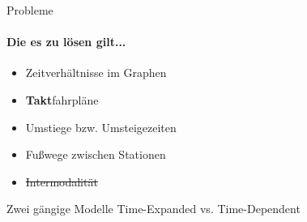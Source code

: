 \begin{frame}{Probleme}
	\framesubtitle{Die es zu lösen gilt...}
	\begin{itemize}
		\item Zeitverhältnisse im Graphen \pause
		\item \textbf{Takt}fahrpläne \pause
		\item Umstiege bzw. Umsteigezeiten \pause		
		\item Fußwege zwischen Stationen \pause
		\item \sout{Intermodalität}
	\end{itemize}
	
	\vspace{6em}
	\begin{block}{Zwei gängige Modelle}
		Time-Expanded vs. Time-Dependent
	\end{block}
\end{frame}




















